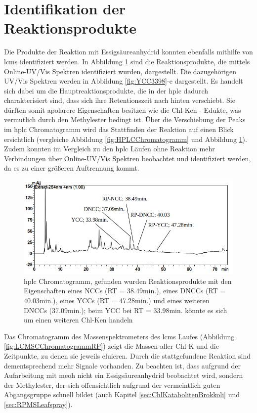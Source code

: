 \pagebreak
\section{Identifikation der Reaktionsprodukte}

Die Produkte der Reaktion mit Essigsäureanhydrid konnten ebenfalls mithilfe von \gls{lcms} identifiziert werden. In Abbildung \ref{fig:HPLCChromatogrammRP} sind die Reaktionsprodukte, die mittels Online-UV/Vis Spektren identifiziert wurden, dargestellt. Die dazugehörigen UV/Vis Spektren werden in Abbildung \ref{fig:YCC3398}-e dargestellt. Es handelt sich dabei um die Hauptreaktionsprodukte, die in der \gls{hplc} dadurch charakterisiert sind, dass sich ihre Retentionszeit nach hinten verschiebt. Sie dürften somit apolarere Eigenschaften besitzen wie die \gls{Chl-K}en - Edukte, was vermutlich durch den Methylester bedingt ist. Über die Verschiebung der Peaks im \gls{hplc} Chromatogramm wird das Stattfinden der Reaktion auf einen Blick ersichtlich (vergleiche Abbildung \ref{fig:HPLCChromatogramm} und Abbildung \ref{fig:HPLCChromatogrammRP}). Zudem konnten im Vergleich zu den \gls{hplc} Läufen ohne Reaktion mehr Verbindungen über Online-UV/Vis Spektren beobachtet und identifiziert werden, da es zu einer größeren Auftrennung kommt.

\begin{figure}[!htbp]
  \includegraphics[width=\textwidth]{figures/Kapitel6/Reaktion3h/HPLC_Chromatogramm.png}
  \caption[HPLC Chromatogramm nach 3h Reaktionsdauer, Quelle: Autor]{\gls{hplc} Chromatogramm, gefunden wurden Reaktionsprodukte mit den Eigenschaften eines NCCs (RT = 38.49min.), eines DNCCs (RT = 40.03min.), eines YCCs (RT = 47.28min.) und eines weiteren DNCCs (37.09min.); beim YCC bei RT = 33.98min. könnte es sich um einen weiteren \gls{Chl-K}en handeln}
  \label{fig:HPLCChromatogrammRP}
\end{figure}

Das Chromatogramm des Massenspektrometers des \gls{lcms} Laufes (Abbildung \ref{fig:LCMSCChromatogrammRP}) zeigt die Massen aller \gls{Chl-K} und die Zeitpunkte, zu denen sie jeweils eluieren. Durch die stattgefundene Reaktion sind dementsprechend mehr Signale vorhanden. Zu beachten ist, dass aufgrund der Aufarbeitung mit \gls{meoh} nicht ein Essigsäureanhydrid beobachtet wird, sondern der Methylester, der sich offensichtlich aufgrund der vermeintlich guten Abgangsgruppe  schnell bildet (auch Kapitel \ref{sec:ChlKatabolitenBrokkoli} und \ref{sec:RPMSLeafspray}). \\

